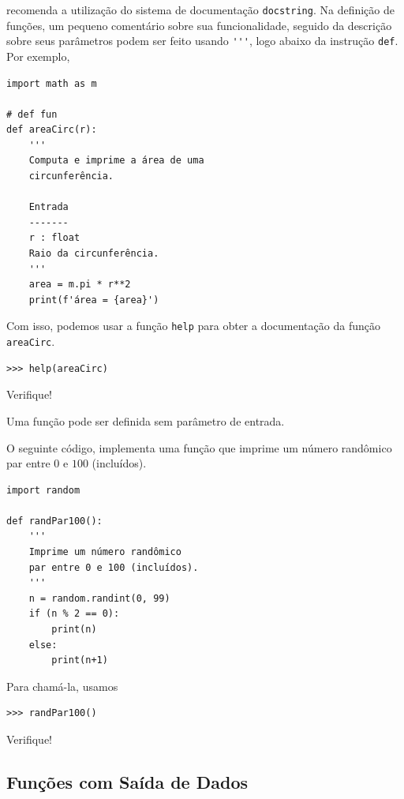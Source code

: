 \begin{obs}
  {\python} recomenda a utilização do sistema de documentação \lstinline+docstring+. Na definição de funções, um pequeno comentário sobre sua funcionalidade, seguido da descrição sobre seus parâmetros podem ser feito usando \lstinline+'''+, logo abaixo da instrução \lstinline+def+. Por exemplo,

\begin{lstlisting}
import math as m

# def fun
def areaCirc(r):
    '''
    Computa e imprime a área de uma
    circunferência.

    Entrada
    -------
    r : float
    Raio da circunferência.
    '''
    area = m.pi * r**2
    print(f'área = {area}')
\end{lstlisting}

Com isso, podemos usar a função \lstinline+help+ para obter a documentação da função \lstinline+areaCirc+.

\begin{lstlisting}
>>> help(areaCirc)
\end{lstlisting}

Verifique!
\end{obs}

Uma função pode ser definida sem parâmetro de entrada.

\begin{ex}
  O seguinte código, implementa uma função que imprime um número randômico par entre $0$ e $100$ (incluídos).

\begin{lstlisting}
import random

def randPar100():
    '''
    Imprime um número randômico
    par entre 0 e 100 (incluídos).
    '''
    n = random.randint(0, 99)
    if (n % 2 == 0):
        print(n)
    else:
        print(n+1)
\end{lstlisting}

Para chamá-la, usamos

\begin{lstlisting}
>>> randPar100()
\end{lstlisting}

Verifique!
\end{ex}

\subsection{Funções com Saída de Dados}

